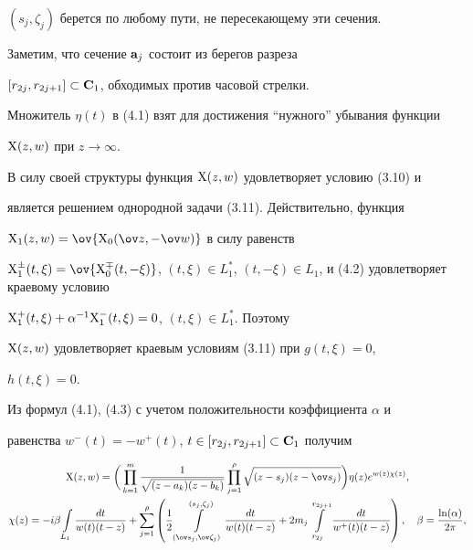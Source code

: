 $(s_j,\zeta_j)$ берется по любому пути, не пересекающему эти сечения. 


Заметим, что сечение $\bold a_j$ состоит из берегов разреза 


$[r_{2j},r_{2j+1}]\subset\bold C_1$, обходимых против часовой стрелки. 


Множитель $\eta(t)$ в (4.1) взят для достижения ``нужного'' убывания функции 


$\mathrm X(z,w)$ при $z\to\infty$. 


 


В силу своей структуры функция $\mathrm X(z,w)$ удовлетворяет условию (3.10) и 


является решением однородной задачи (3.11). Действительно, функция 


$\X_1(z,w)=\ov{\X_0(\ov z,-\ov w)}$ в силу равенств 


$\X^\pm_1(t,\xi)=\ov{\X^\mp_0(t,-\xi)}$, $(t,\xi)\in L^*_1$, $(t,-\xi)\in 


L_1$, и (4.2) удовлетворяет краевому условию 


$\mathrm X^+_1(t,\xi)+\alpha^{-1}\mathrm X^-_1(t,\xi)=0$, $(t,\xi)\in L^*_1$. Поэтому 


$\mathrm X(z,w)$ удовлетворяет краевым условиям (3.11) при $g(t,\xi)=0$, 


$h(t,\xi)=0$. 


 


Из формул (4.1), (4.3) с учетом положительности коэффициента $\alpha$ и 


равенства $w^-(t)=-w^+(t)$, $t\in[r_{2j},r_{2j+1}]\subset\bold C_1$ получим 


\begin{gather} 


\X(z,w)=\bigg(\prod^m_{k=1}\frac{1}{\sqrt{(z-a_k)(z-b_k)}} 


\prod^\rho_{j=1}\sqrt{(z-s_j)(z-\ov s_j)}\bigg) 


\eta(z)e^{w(z)\chi(z)},\\ 


\chi(z)=-i\beta\int\limits_{L_1}\frac{dt}{w(t)(t-z)}+\sum^\rho_{j=1} 


\left(\frac{1}{2}\int\limits^{(s_j,\zeta_j)}_{(\ov s_j,\ov\zeta_j)} 


\frac{dt}{w(t)(t-z)}+2m_j\int\limits^{r_{2j+1}}_{r_{2j}} 


\frac{dt}{w^+(t)(t-z)}\right),\quad 


\beta=\frac{\ln(\alpha)}{2\pi},\notag 


\end{gather} 


